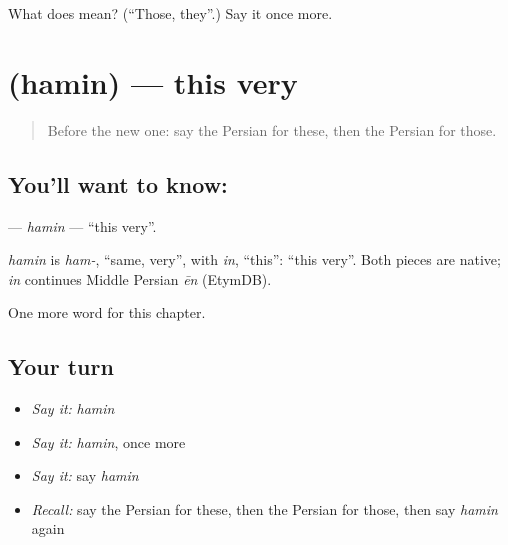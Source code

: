 \begin{tcolorbox}[breakable,colback=teal!4,colframe=teal!35!black,title={Before you move on}]
What does  mean? (\textquotedblleft{}Those, they\textquotedblright{}.) Say it once more.
\end{tcolorbox}
\section[\texorpdfstring{\fa{همین} (hamin)}{همین (hamin)}]{ (hamin) — this very}

\label{lesson:FA-C83-hamin}



\begin{quote}
Before the new one: say the Persian for these, then the Persian for those.
\end{quote}

\subsection*{You'll want to know: }
\textbf{} — \emph{hamin} — \textquotedblleft{}this very\textquotedblright{}.

\begin{cousinweb}
\emph{hamin} is \emph{ham-}, \textquotedblleft{}same, very\textquotedblright{}, with \emph{in}, \textquotedblleft{}this\textquotedblright{}: \textquotedblleft{}this very\textquotedblright{}. Both pieces are native; \emph{in} continues Middle Persian \emph{ēn} (EtymDB).
\end{cousinweb}

\begin{grammarlens}[title={What you've built}]
One more word for this chapter.
\end{grammarlens}

\subsection*{Your turn}
\begin{itemize}
\raggedright
  \item \emph{Say it:} \emph{hamin}
  \item \emph{Say it:} \emph{hamin}, once more
  \item \emph{Say it:} say \emph{hamin}
  \item \emph{Recall:} say the Persian for these, then the Persian for those, then say \emph{hamin} again
\end{itemize}

